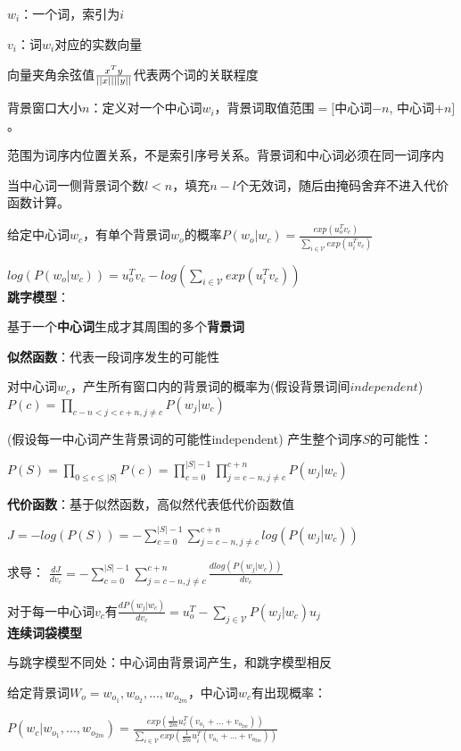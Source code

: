 \documentclass[UTF8]{ctexart}
\begin{document}
  \quad $w_i$：一个词，索引为$i$

  \quad $v_i$：词$w_i$对应的实数向量
  
  \quad \quad 向量夹角余弦值$\frac{x^Ty}{||x||\space ||y||}$代表两个词的关联程度

  \quad 背景窗口大小$n$：定义对一个中心词$w_i$，背景词取值范围$=[$中心词$-n$, 中心词$+n]$。
  
  \quad \quad 范围为词序内位置关系，不是索引序号关系。背景词和中心词必须在同一词序内

  \quad \quad 当中心词一侧背景词个数$l<n$，填充$n-l$个无效词，随后由掩码舍弃不进入代价函数计算。

  给定中心词$w_c$，有单个背景词$w_o$的概率$P(w_o | w_c) = \frac{exp(u_o^Tv_c)}{\sum_{i\in\mathcal{V} } exp(u_i^Tv_c)}$
  
  \quad $ log(P(w_o | w_c)) = u_o^Tv_c - log(\sum_{i\in\mathcal{V} } exp(u_i^Tv_c))$\\
\textbf{跳字模型}：
  
  基于一个\textbf{中心词}生成才其周围的多个\textbf{背景词}

  \textbf{似然函数}：代表一段词序发生的可能性

  \quad 对中心词$w_c$，产生所有窗口内的背景词的概率为(假设背景词间$independent$)$P(c) = \prod_{c-n<j<c+n, j \neq c} P(w_j | w_c)$

  \quad (假设每一中心词产生背景词的可能性independent) 产生整个词序$S$的可能性：
  
  \quad \quad $P(S) = \prod_{0\leq c \leq |S|} P(c) = \prod_{c = 0}^{|S|-1} \prod_{j = c-n, j \neq c}^{c+n} P(w_j | w_c)$
  
  \textbf{代价函数}：基于似然函数，高似然代表低代价函数值

  \quad $J = -log(P(S)) = -\sum_{c = 0}^{|S|-1} \sum_{j = c-n, j \neq c}^{c+n} log(P(w_j | w_c))$
  
  \quad 求导： $\frac{d J}{d v_c} = -\sum_{c = 0}^{|S|-1} \sum_{j = c-n, j \neq c}^{c+n} \frac{d log(P(w_j | w_c))}{d v_c}$

  \quad \quad 对于每一中心词$v_c$有$\frac{d P(w_j | w_c)}{d v_c} = u_o^T - \sum_{j\in\mathcal{V}}P(w_j | w_c)u_j$\\
\textbf{连续词袋模型}

  与跳字模型不同处：中心词由背景词产生，和跳字模型相反

  给定背景词$W_o = w_{o_1}, w_{o_2}, ..., w_{o_{2m}}$，中心词$w_c$有出现概率：
  
  \quad $P(w_c | w_{o_1}, ..., w_{o_{2m}}) = \frac{exp(\frac{1}{2m}u_c^T(v_{o_1} + ... + v_{o_{2m}}))}{\sum_{i\in \mathcal{V} } exp(\frac{1}{2m}u_i^T(v_{o_1} + ... + v_{o_{2m}}))}$
\end{document}
